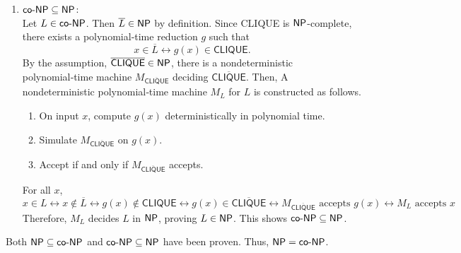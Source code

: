 \begin{enumerate}
\begin{prove}
\begin{enumerate}
            Let \(L\in\NP\) be arbitrary.  Then there exists a polynomial‑time reduction \(f\) such that
            \[
                x\in L \leftrightarrow f(x)\in \textsf{CLIQUE}.
            \]
            By the assumption, \(\overline{\textsf{CLIQUE}}\in\NP\), 
            \[
                x \in \overline{L} 
                \leftrightarrow
                x\notin L
                \leftrightarrow
                f(x)\notin \textsf{CLIQUE}
                \leftrightarrow
                f(x)\in \overline{\textsf{CLIQUE}},
            \]
            and so \(\overline{L}\in\NP\).  By definition of \(\coNP\), it follows that \(L\in\coNP\).  Thus \(\NP\subseteq\coNP\).
    
            \item \(\textsf{co-NP} \subseteq \textsf{NP}\):\\
            Let \(L\in\coNP\).  Then \(\overline{L}\in\NP\) by definition.  Since \textsf{CLIQUE} is \(\textsf{NP}\)\nobreakdash-complete, there exists a polynomial‑time reduction \(g\) such that
            \[
                x\in \overline{L}
                \leftrightarrow
                g(x)\in \textsf{CLIQUE}.
            \]
            By the assumption, \(\overline{\textsf{CLIQUE}}\in\NP\),  
            there is a nondeterministic polynomial‑time machine 
            \(M_{\overline{\textsf{CLIQUE}}}\) deciding \(\overline{\textsf{CLIQUE}}\). Then,
            A nondeterministic polynomial‑time machine \(M_L\) for \(L\) is constructed as follows.
            \begin{enumerate}
                \item On input \(x\), compute \(g(x)\) deterministically in polynomial time.
                \item Simulate \(M_{\overline{\textsf{CLIQUE}}}\) on \(g(x)\).
                \item Accept if and only if \(M_{\overline{\textsf{CLIQUE}}}\) accepts.
            \end{enumerate}
            For all \(x\),
            \[
                x\in L
                \leftrightarrow
                x\notin \overline{L}
                \leftrightarrow
                g(x)\notin \textsf{CLIQUE}
                \leftrightarrow
                g(x)\in \overline{\textsf{CLIQUE}}
                \leftrightarrow
                M_{\overline{\textsf{CLIQUE}}}\text{ accepts }g(x)
                \leftrightarrow
                M_L\text{ accepts }x
            \]
            Therefore, \(M_L\) decides \(L\) in \(\textsf{NP}\), proving \(L \in \NP\).
            This shows \(\textsf{co-NP} \subseteq \textsf{NP}\).
        \end{enumerate}
        Both \(\NP \subseteq \coNP\) and \(\textsf{co-NP} \subseteq \textsf{NP}\) have been 
        proven. Thus, \(\textsf{NP} = \textsf{co-NP}\).        
    \end{prove}
    



\end{enumerate}
